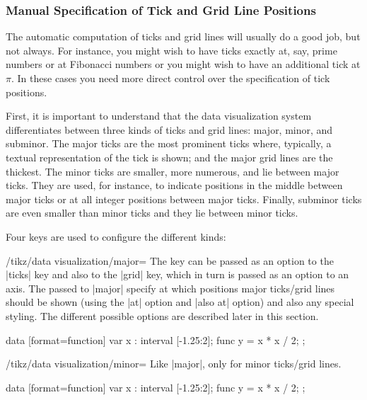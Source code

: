 \subsubsection{Manual Specification of Tick and Grid Line Positions}

The automatic computation of ticks and grid lines will usually do a
good job, but not always. For instance, you might wish to have ticks
exactly at, say, prime numbers or at Fibonacci numbers or you might
wish to have an additional tick at $\pi$. In these cases you need more
direct control over the specification of tick positions.

First, it is important to understand that the data visualization
system differentiates between three kinds of 
ticks and grid lines: major, minor, and subminor. The major ticks are
the most prominent ticks where, typically, a textual representation of
the tick is shown; and the major grid lines are the thickest. The
minor ticks are smaller, more numerous, and lie between major
ticks. They are used, for instance, to indicate positions in the
middle between major ticks or at all integer positions between major
ticks. Finally, subminor ticks are even smaller than minor ticks and
they lie between minor ticks. 

Four keys are used to configure the different kinds:

\begin{key}{/tikz/data visualization/major=}
  The key can be passed as an option to the |ticks| key and also to
  the |grid| key, which in turn is passed as an option to an axis. The
   passed to |major| specify at which positions
  major ticks/grid lines should be shown (using the |at| option and
  |also at| option) and also any special styling. The different
  possible options are described later in this section.
\begin{codeexample}[]
\tikz \datavisualization
  [ school book axes, visualize as smooth line,
    x axis={ticks={major={at={1, 1.5, 2}}}}]
  data [format=function] {
    var x : interval [-1.25:2];
    func y = \value x * \value x / 2;
  };
\end{codeexample}
\end{key}

\begin{key}{/tikz/data visualization/minor=}
  Like |major|, only for minor ticks/grid lines.
\begin{codeexample}[]
\tikz \datavisualization
  [ school book axes, visualize as smooth line,
    x axis={grid={minor={at={1, 1.5, 2}}}}]
  data [format=function] {
    var x : interval [-1.25:2];
    func y = \value x * \value x / 2;
  };
\end{codeexample}
\end{key}

